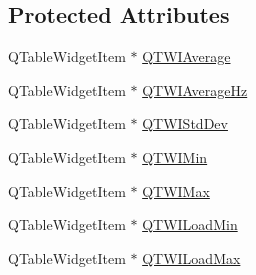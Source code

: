 \subsection*{Protected Attributes}
\begin{DoxyCompactItemize}
\item 
Q\-Table\-Widget\-Item $\ast$ \hyperlink{classmts_qt_widget_interval_statistics_a6f47d982a6aa33cb23117f6f2fc50512}{Q\-T\-W\-I\-Average}
\item 
Q\-Table\-Widget\-Item $\ast$ \hyperlink{classmts_qt_widget_interval_statistics_a43e6f936558cc745c82ae49e9cd3d98f}{Q\-T\-W\-I\-Average\-Hz}
\item 
Q\-Table\-Widget\-Item $\ast$ \hyperlink{classmts_qt_widget_interval_statistics_aee0f20cac1a5a0b0f44389a5154ca58f}{Q\-T\-W\-I\-Std\-Dev}
\item 
Q\-Table\-Widget\-Item $\ast$ \hyperlink{classmts_qt_widget_interval_statistics_aea3548dcfa553d0e74440d7b8d6aa1a7}{Q\-T\-W\-I\-Min}
\item 
Q\-Table\-Widget\-Item $\ast$ \hyperlink{classmts_qt_widget_interval_statistics_a0eba8f4d0ffd245505d1bd6302971e63}{Q\-T\-W\-I\-Max}
\item 
Q\-Table\-Widget\-Item $\ast$ \hyperlink{classmts_qt_widget_interval_statistics_a487970f507670f949a1ae1dd1bc97af3}{Q\-T\-W\-I\-Load\-Min}
\item 
Q\-Table\-Widget\-Item $\ast$ \hyperlink{classmts_qt_widget_interval_statistics_ad2e0593b7cb9f6bbceb30ac71e9d8923}{Q\-T\-W\-I\-Load\-Max}
\end{DoxyCompactItemize}


